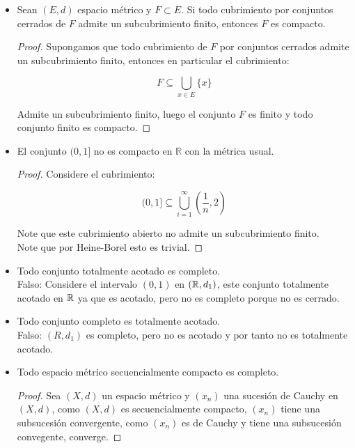 \begin{itemize}[leftmargin=*]
    \item Sean $(E, d)$ espacio métrico y $F \subset E$. Si todo cubrimiento por conjuntos cerrados de $F$ admite un subcubrimiento finito, entonces $F$ es compacto.\\

    \begin{proof}
    Supongamos que todo cubrimiento de $F$ por conjuntos cerrados admite un subcubrimiento finito, entonces en particular el cubrimiento:

    $$F\subseteq\bigcup_{x \in E}\{x\} 
        $$

     Admite un subcubrimiento finito, luego el conjunto $F$ es finito y todo conjunto finito es compacto.
    \end{proof}

    \item 
El conjunto $(0,1]$ no es compacto en $\mathbb{R}$ con la métrica usual.\\

    \begin{proof}
    Considere el cubrimiento:

    $$(0,1]\subseteq\bigcup_{i=1}^{\infty} 
        \left(\frac{1}{n},2\right)$$

    Note que este cubrimiento abierto no admite un subcubrimiento finito.\\

    Note que por Heine-Borel esto es trivial.
    \end{proof}

    \item Todo conjunto totalmente acotado es completo.\\

    Falso: Considere el intervalo $(0,1)$ en $(\mathbb{R},d_1)$, este conjunto totalmente acotado en $\mathbb{R}$ ya que es acotado, pero no es completo porque no es cerrado.

    \item Todo conjunto completo es totalmente acotado.\\
    
    Falso: $(R,d_1)$ es completo, pero no es acotado y por tanto no es totalmente acotado.

    \item Todo espacio métrico secuencialmente compacto es completo. \\

    \begin{proof}
    Sea $(X,d)$ un espacio métrico y $(x_n)$ una sucesión de Cauchy en $(X,d)$, como $(X,d)$ es secuencialmente compacto, $(x_n)$ tiene una subsucesión convergente, como $(x_n)$ es de Cauchy y tiene una subsucesión convegente, converge.
    \end{proof}


\end{itemize}
